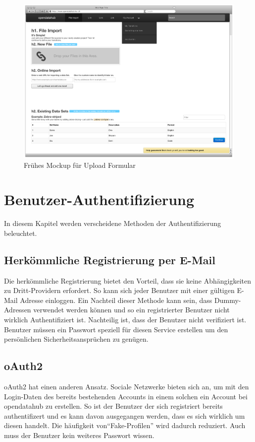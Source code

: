 \begin{figure}[H]
    \centering
    \includegraphics[width=0.8\linewidth]{fig/Wireframes-Upload}
    \caption{Frühes Mockup für Upload Formular}
    \label{fig:pd:wireframe-upload}
\end{figure}

\section{Benutzer-Authentifizierung}
In diesem Kapitel werden verscheidene Methoden der Authentifizierung beleuchtet.
\subsection{Herkömmliche Registrierung per E-Mail}
Die herkömmliche Registrierung bietet den Vorteil, dass sie keine Abhängigkeiten zu Dritt-Providern erfordert. So kann sich jeder Benutzer mit einer gültigen E-Mail Adresse einloggen. Ein Nachteil dieser Methode kann sein, dass Dummy-Adressen verwendet werden können und so ein registrierter Benutzer nicht wirklich Authentifiziert ist. Nachteilig ist, dass der Benutzer nicht verifiziert ist. Benutzer müssen ein Passwort speziell für diesen Service erstellen um den persönlichen Sicherheitsansprüchen zu genügen.
\subsection{oAuth2}
oAuth2 hat einen anderen Ansatz. Sociale Netzwerke bieten sich an, um mit den Login-Daten des bereits bestehenden Accounts in einem solchen ein Account bei opendatahub zu erstellen. So ist der Benutzer der sich registriert bereits authentifizert und es kann davon ausgegangen werden, dass es sich wirklich um diesen handelt. Die häufigkeit von``Fake-Profilen'' wird dadurch reduziert. Auch muss der Benutzer kein weiteres Passwort wissen.
